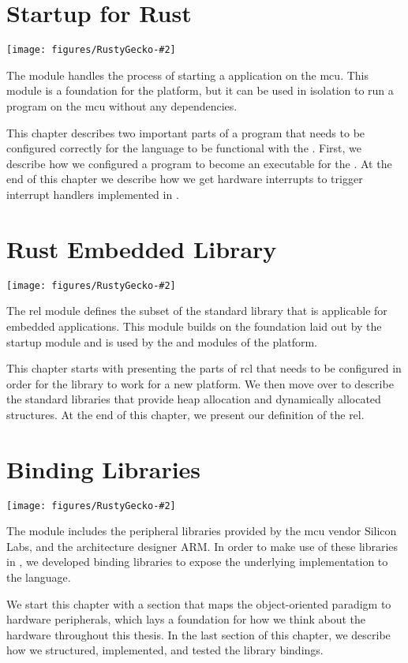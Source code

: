
\newcommand{\corechapter}[3]{
  \chapter{#1}
  \label{chap:#2}
  \begin{center}
    \texttt{[image: figures/RustyGecko-\#2]}
  \end{center}
  \hfill \break
  \hfill \break
#3
}

\corechapter{Startup for Rust}{startup}{%
The  module handles the process of starting a {\rust} application on the \glsdesc{mcu}.
This module is a foundation for the {\rg} platform, but it can be used in isolation to run a program on the \gls{mcu} without any dependencies.

This chapter describes two important parts of a {\rust} program that needs to be configured correctly for the language to be functional with the {\gecko}.
First, we describe how we configured a {\rust} program to become an executable for the {\gecko}.
At the end of this chapter we describe how we get hardware interrupts to trigger interrupt handlers implemented in {\rust}.
}


\corechapter{Rust Embedded Library}{rel}{%
The \glsdesc{rel} module defines the subset of the standard {\rust} library that is applicable for embedded applications.
This module builds on the foundation laid out by the startup module and is used by the \lib{bindings} and \lib{Application Layer} modules of the {\rg} platform.

This chapter starts with presenting the parts of \gls{rcl} that needs to be configured in order for the library to work for a new platform.
We then move over to describe the standard {\rust} libraries that provide heap allocation and dynamically allocated structures.
At the end of this chapter, we present our definition of the \gls{rel}.
}



\corechapter{Binding Libraries}{bindings}{%
The  module includes the peripheral libraries provided by the \gls{mcu} vendor Silicon Labs, and the architecture designer ARM.
In order to make use of these libraries in {\rust}, we developed binding libraries to expose the underlying {\C} implementation to the {\rust} language.

We start this chapter with a section that maps the object-oriented paradigm to hardware peripherals, which lays a foundation for how we think about the hardware throughout this thesis.
In the last section of this chapter, we describe how we structured, implemented, and tested the library bindings.
}




